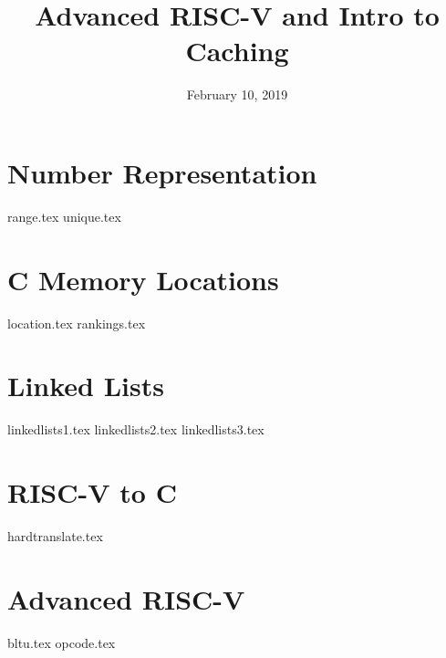 \documentclass[11pt]{exam}
\title{Advanced RISC-V and Intro to Caching}
\date{February 10, 2019}
\begin{document}
\maketitle

\section{Number Representation}
\begin{questions}
{range.tex}
{unique.tex}
\end{questions}
\newpage

\section{C Memory Locations}
\begin{questions}
{location.tex}
{rankings.tex}
\end{questions}
\newpage

\section{Linked Lists}
\begin{questions}
{linkedlists1.tex}
{linkedlists2.tex}
{linkedlists3.tex}
\end{questions}
\newpage

\section{RISC-V to C}
\begin{questions}
{hardtranslate.tex}
\end{questions}
\newpage

\section{Advanced RISC-V}
\begin{questions}
{bltu.tex}
{opcode.tex}
\end{questions}
\newpage
\end{document}
